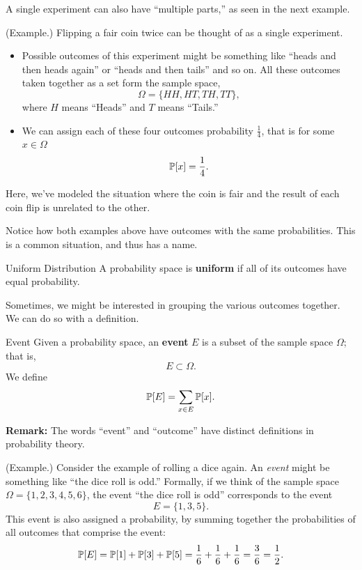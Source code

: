 \documentclass[letterpaper]{article}
\newcommand{\0}{\mathbf{0}}
\begin{document}
A single experiment can also have ``multiple parts,'' as seen in the next example. 
\begin{mdframed}
    (Example.) Flipping a fair coin twice can be thought of as a single experiment. 
    \begin{itemize}
        \item Possible outcomes of this experiment might be something like ``heads and then heads again'' or ``heads and then tails'' and so on. All these outcomes taken together as a set form the sample space, 
        \[\Omega = \{HH, HT, TH, TT\},\]
        where $H$ means ``Heads'' and $T$ means ``Tails.''

        \item We can assign each of these four outcomes probability $\frac{1}{4}$, that is for some $x \in \Omega$
        \[\mathbb{P}[x] = \frac{1}{4}.\]
    \end{itemize}
    Here, we've modeled the situation where the coin is fair and the result of each coin flip is unrelated to the other. 
\end{mdframed}
Notice how both examples above have outcomes with the same probabilities. This is a common situation, and thus has a name.

\begin{definition}{Uniform Distribution}{}
    A probability space is \textbf{uniform} if all of its outcomes have equal probability. 
\end{definition}
Sometimes, we might be interested in grouping the various outcomes together. We can do so with a definition.

\begin{definition}{Event}{}
    Given a probability space, an \textbf{event} $E$ is a subset of the sample space $\Omega$; that is, 
    \[E \subset \Omega.\]
    We define 
    \[\mathbb{P}[E] = \sum_{x \in E} \mathbb{P}[x].\]
\end{definition}
\textbf{Remark:} The words ``event'' and ``outcome'' have distinct definitions in probability theory.

\begin{mdframed}
    (Example.) Consider the example of rolling a dice again. An \emph{event} might be something like ``the dice roll is odd.'' Formally, if we think of the sample space $\Omega = \{1, 2, 3, 4, 5, 6\}$, the event ``the dice roll is odd'' corresponds to the event \[E = \{1, 3, 5\}.\] This event is also assigned a probability, by summing together the probabilities of all outcomes that comprise the event:
    \[\mathbb{P}[E] = \mathbb{P}[1] + \mathbb{P}[3] + \mathbb{P}[5] = \frac{1}{6} + \frac{1}{6} + \frac{1}{6} = \frac{3}{6} = \frac{1}{2}.\]
\end{mdframed}
\end{document}

